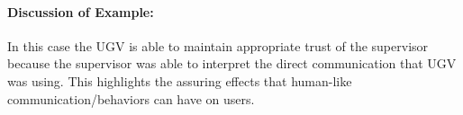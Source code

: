 \paragraph{\textbf{Discussion of Example:}} In this case the UGV is able to maintain appropriate trust of the supervisor because the supervisor was able to interpret the direct communication that UGV was using. This highlights the assuring effects that human-like communication/behaviors can have on users. 
